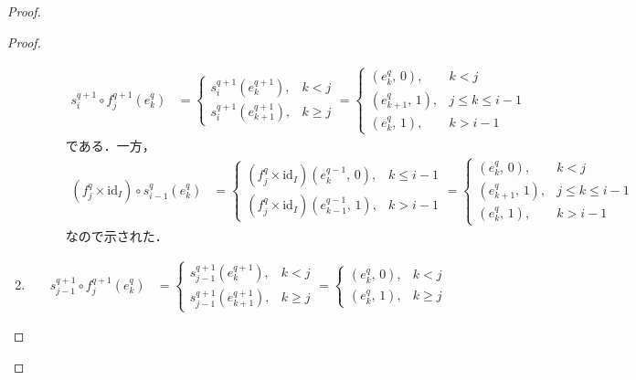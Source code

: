 \documentclass[algtopo_main]{subfiles}
\begin{document}
\begin{proof}
\begin{proof}
\begin{enumerate}
\begin{description}
\begin{align}
                    s_i^{q+1} \circ f_j^{q+1} (e_k^q) &=
                    \begin{cases}
                        s_i^{q+1}(e_k^{q+1}), &k < j \\
                        s_i^{q+1}(e_{k+1}^{q+1}), &k \ge j
                    \end{cases}
                    =
                    \begin{cases}
                        (e_k^q,\, 0), &k < j \\
                        (e_{k+1}^q,\, 1), &j \le k \le i-1 \\
                        (e_{k}^q,\, 1), &k > i-1
                    \end{cases}
                \end{align}
                である．一方，
                \begin{align}
                    (f_{j}^{q} \times \mathrm{id}_I) \circ s_{i-1}^q(e_k^q) &= 
                    \begin{cases}
                        (f_{j}^{q} \times \mathrm{id}_I)(e_k^{q-1},\, 0), &k \le i-1 \\
                        (f_{j}^{q} \times \mathrm{id}_I)(e_{k-1}^{q-1},\, 1), &k > i-1
                    \end{cases}
                    =
                    \begin{cases}
                        (e_k^q,\, 0), &k < j \\
                        (e_{k+1}^q,\, 1), &j \le k \le i-1 \\
                        (e_{k}^q,\, 1), &k > i-1
                    \end{cases}
                \end{align}
                なので示された．
            \end{description}
            \item \begin{align}
                s_{j-1}^{q+1} \circ f_j^{q+1} (e_k^q) &=
                \begin{cases}
                    s_{j-1}^{q+1}(e_k^{q+1}), &k < j \\
                    s_{j-1}^{q+1}(e_{k+1}^{q+1}), &k \ge j
                \end{cases}
                =
                \begin{cases}
                    (e_k^{q},\, 0), &k < j \\
                    (e_{k}^{q},\, 1), &k \ge j

\end{cases}
\end{align}
\end{enumerate}
\end{proof}
\end{proof}
\end{document}
